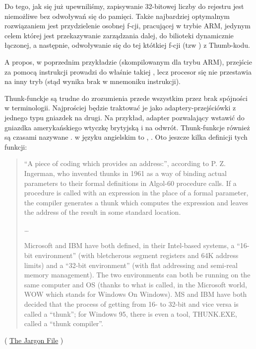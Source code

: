 Do tego, jak się już upewniliśmy, zapisywanie 32-bitowej liczby do rejestru jest niemożliwe bez odwoływań się do pamięci.
Także najbardziej optymalnym rozwiązaniem jest przydzielenie osobnej f-cji, pracującej w trybie ARM, 
jedynym celem której jest przekazywanie zarządzania dalej, do bilioteki dynamicznie łączonej, a następnie, odwoływanie się do tej któtkiej f-cji (tzw ) z Thumb-kodu.

A propos, w poprzednim przykładzie (skompilowanym dla trybu ARM), przejście za pomocą instrukcji  prowadzi 
do właśnie takiej , lecz procesor się nie przestawia na inny tryb (stąd wynika brak  w mnemoniku instrukcji).


Thunk-funckje są trudne do zrozumienia przede wszystkim przez brak spójności w terminologii.
Najprościej będzie traktować je jako adaptery-przejściówki z jednego typu gniazdek na drugi.
Na przykład, adapter pozwalający wstawić do gniazdka amerykańskiego wtyczkę brytyjską i na odwrót. Thunk-funkcje również są czasami nazywane .  w języku angielskim to , .
Oto jeszcze kilka definicji tych funkcji:

\begin{framed}
\begin{quotation}
“A piece of coding which provides an address:”, according to P. Z. Ingerman, 
who invented thunks in 1961 as a way of binding actual parameters to their formal 
definitions in Algol-60 procedure calls. If a procedure is called with an expression 
in the place of a formal parameter, the compiler generates a thunk which computes 
the expression and leaves the address of the result in some standard location.

\dots

Microsoft and IBM have both defined, in their Intel-based systems, a “16-bit environment” 
(with bletcherous segment registers and 64K address limits) and a “32-bit environment” 
(with flat addressing and semi-real memory management). The two environments can both be 
running on the same computer and OS (thanks to what is called, in the Microsoft world, 
WOW which stands for Windows On Windows). MS and IBM have both decided that the process 
of getting from 16- to 32-bit and vice versa is called a “thunk”; for Windows 95, 
there is even a tool, THUNK.EXE, called a “thunk compiler”.
\end{quotation}
\end{framed}
( \href{http://go.yurichev.com/17362}{The Jargon File} )

